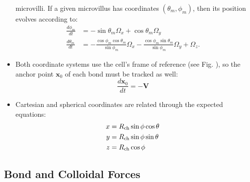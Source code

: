 \documentclass[
10pt, %
letterpaper, %
twocolumn, %
landscape %
]{article}
\newcommand{\ch}{\textnormal{ch}}
\newcommand{\x}{\mathbf{x}}
\begin{document}
\begin{itemize}
  microvilli. If a given microvillus has coordinates $(\theta_m,
  \phi_m)$, then its position evolves according to:
  \begin{align}
    \label{eq:phi_evol}
    \frac{d \phi_m}{dt} &= -\sin\theta_m \Omega_x + \cos\theta_m
                          \Omega_y \\
    \label{eq:thet_evol}
    \frac{d \theta_m}{dt} &= -\frac{\cos\phi_m
                            \cos\theta_m}{\sin\phi_m} \Omega_x -
                            \frac{\cos\phi_m \sin\theta_m}{\sin
                            \phi_m} \Omega_y + \Omega_z.
  \end{align}
\item Both coordinate systems use the cell's frame of reference (see
  Fig. ), so the anchor point $\x_0$ of each bond must be tracked as
  well:
  \begin{equation}
    \label{eq:anch_evol}
    \frac{d \x_0}{dt} = -\mathbf{V}
  \end{equation}
\item Cartesian and spherical coordinates are related through the
  expected equations:
  \begin{align*}
    x &= R_\ch \sin\phi \cos\theta \\
    y &= R_\ch \sin\phi \sin\theta \\
    z &= R_\ch \cos\phi
  \end{align*}
\end{itemize}

\subsection{Bond and Colloidal Forces}
\label{sec:bond-coll-forc}
\end{document}

